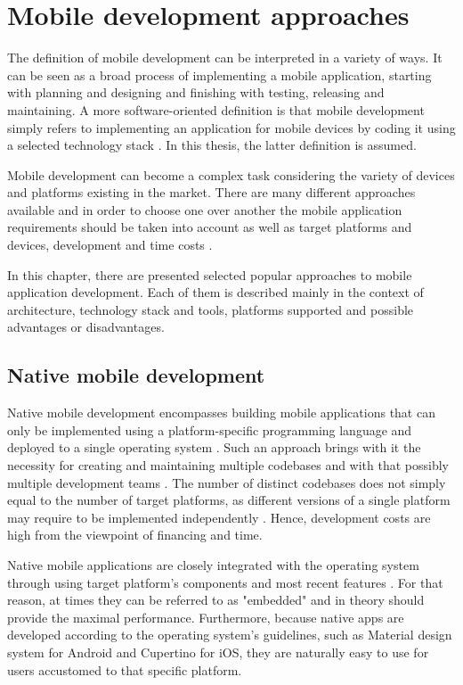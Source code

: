 
\section{Mobile development approaches}

The definition of mobile development can be interpreted in a variety of ways. It can be seen as a broad process of implementing a mobile application, starting with planning and designing and finishing with testing, releasing and maintaining. A more software-oriented definition is that mobile development simply refers to implementing an application for mobile devices by coding it using a selected technology stack \cite{microsoft_mobile_development}. In this thesis, the latter definition is assumed.

Mobile development can become a complex task considering the variety of devices and platforms existing in the market. There are many different approaches available and in order to choose one over another the mobile application requirements should be taken into account as well as target platforms and devices, development and time costs \cite{velvetech_mobile_dev_approaches}.

In this chapter, there are presented selected popular approaches to mobile application development. Each of them is described mainly in the context of architecture, technology stack and tools, platforms supported and possible advantages or disadvantages.

\subsection{Native mobile development}\label{chap:native}

Native mobile development encompasses building mobile applications that can only be implemented using a platform-specific programming language and deployed to a single operating system \cite{comparative_analysis_native_hybrid}. Such an approach brings with it the necessity for creating and maintaining multiple codebases and with that possibly multiple development teams \cite{approach_to_assess_performance_case_study}. The number of distinct codebases does not simply equal to the number of target platforms, as different versions of a single platform may require to be implemented independently \cite{appdynamics_mobile_app_performance}. Hence, development costs are high from the viewpoint of financing and time.

Native mobile applications are closely integrated with the operating system through using target platform's components \cite{comparison_perf_looks_flutter_native,comp_analysis_hybrid_frameworks} and most recent features \cite{eval_rn_flutter}. For that reason, at times they can be referred to as "embedded" 
 \cite{cross_platform_development_study_rn_flutter} and in theory should provide the maximal performance. Furthermore, because native apps are developed according to the operating system's guidelines, such as Material design system for Android and Cupertino for iOS, they are naturally easy to use for users accustomed to that specific platform.


